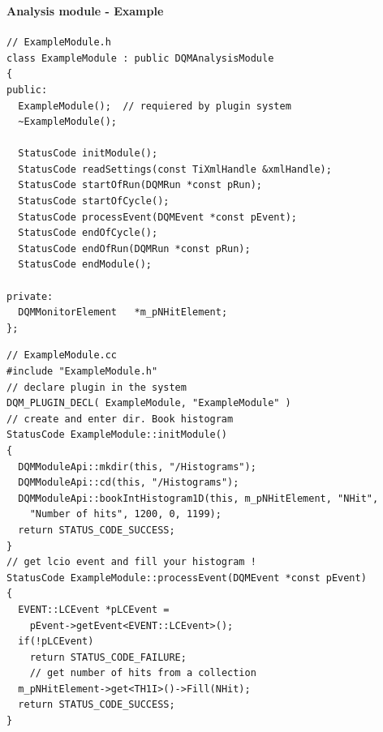 \documentclass[8pt]{beamer}
\begin{document}
    \begin{frame}[containsverbatim]
      \frametitle{\secname}
      \framesubtitle{Analysis module - Example }

      \begin{minipage}{0.49\textwidth}
        \begin{lstlisting}
// ExampleModule.h
class ExampleModule : public DQMAnalysisModule
{
public:
  ExampleModule();  // requiered by plugin system
  ~ExampleModule();

  StatusCode initModule();
  StatusCode readSettings(const TiXmlHandle &xmlHandle);
  StatusCode startOfRun(DQMRun *const pRun);
  StatusCode startOfCycle();
  StatusCode processEvent(DQMEvent *const pEvent);
  StatusCode endOfCycle();
  StatusCode endOfRun(DQMRun *const pRun);
  StatusCode endModule();

private:
  DQMMonitorElement   *m_pNHitElement;
};
        \end{lstlisting}
      \end{minipage}
      \begin{minipage}{0.49\textwidth}
        \begin{lstlisting}
// ExampleModule.cc
#include "ExampleModule.h"
// declare plugin in the system
DQM_PLUGIN_DECL( ExampleModule, "ExampleModule" )
// create and enter dir. Book histogram
StatusCode ExampleModule::initModule()
{
  DQMModuleApi::mkdir(this, "/Histograms");
  DQMModuleApi::cd(this, "/Histograms");
  DQMModuleApi::bookIntHistogram1D(this, m_pNHitElement, "NHit",
    "Number of hits", 1200, 0, 1199);
  return STATUS_CODE_SUCCESS;
}
// get lcio event and fill your histogram !
StatusCode ExampleModule::processEvent(DQMEvent *const pEvent)
{
  EVENT::LCEvent *pLCEvent =
    pEvent->getEvent<EVENT::LCEvent>();
  if(!pLCEvent)
    return STATUS_CODE_FAILURE;
    // get number of hits from a collection
  m_pNHitElement->get<TH1I>()->Fill(NHit);
  return STATUS_CODE_SUCCESS;
}
        \end{lstlisting}
      \end{minipage}


    \end{frame}
\end{document}
